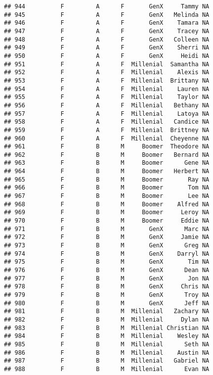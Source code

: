 \documentclass[
]{article}
\begin{document}
\begin{verbatim}
## 944          F         A      F       GenX     Tammy NA
## 945          F         A      F       GenX   Melinda NA
## 946          F         A      F       GenX    Tamara NA
## 947          F         A      F       GenX    Tracey NA
## 948          F         A      F       GenX   Colleen NA
## 949          F         A      F       GenX    Sherri NA
## 950          F         A      F       GenX     Heidi NA
## 951          F         A      F  Millenial  Samantha NA
## 952          F         A      F  Millenial    Alexis NA
## 953          F         A      F  Millenial  Brittany NA
## 954          F         A      F  Millenial    Lauren NA
## 955          F         A      F  Millenial    Taylor NA
## 956          F         A      F  Millenial   Bethany NA
## 957          F         A      F  Millenial    Latoya NA
## 958          F         A      F  Millenial   Candice NA
## 959          F         A      F  Millenial  Brittney NA
## 960          F         A      F  Millenial  Cheyenne NA
## 961          F         B      M     Boomer  Theodore NA
## 962          F         B      M     Boomer   Bernard NA
## 963          F         B      M     Boomer      Gene NA
## 964          F         B      M     Boomer   Herbert NA
## 965          F         B      M     Boomer       Ray NA
## 966          F         B      M     Boomer       Tom NA
## 967          F         B      M     Boomer       Lee NA
## 968          F         B      M     Boomer    Alfred NA
## 969          F         B      M     Boomer     Leroy NA
## 970          F         B      M     Boomer     Eddie NA
## 971          F         B      M       GenX      Marc NA
## 972          F         B      M       GenX     Jamie NA
## 973          F         B      M       GenX      Greg NA
## 974          F         B      M       GenX    Darryl NA
## 975          F         B      M       GenX       Tim NA
## 976          F         B      M       GenX      Dean NA
## 977          F         B      M       GenX       Jon NA
## 978          F         B      M       GenX     Chris NA
## 979          F         B      M       GenX      Troy NA
## 980          F         B      M       GenX      Jeff NA
## 981          F         B      M  Millenial   Zachary NA
## 982          F         B      M  Millenial     Dylan NA
## 983          F         B      M  Millenial Christian NA
## 984          F         B      M  Millenial    Wesley NA
## 985          F         B      M  Millenial      Seth NA
## 986          F         B      M  Millenial    Austin NA
## 987          F         B      M  Millenial   Gabriel NA
## 988          F         B      M  Millenial      Evan NA

\end{verbatim}
\end{document}
